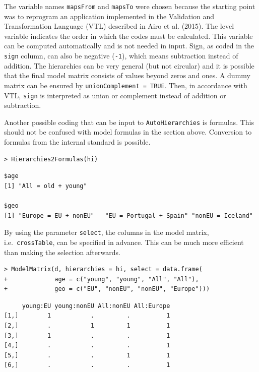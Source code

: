 The variable names \texttt{mapsFrom} and \texttt{mapsTo} were chosen because the starting point was to reprogram an application implemented in the
Validation and Transformation Language (VTL) described in Airo et al. (2015).
The level variable indicates the order in which the codes must be calculated.
This variable can be computed automatically and is not needed in input.
Sign, as coded in the \texttt{sign} column, can also be negative (\texttt{-1}), which means subtraction instead of addition.
The hierarchies can be very general (but not circular) and it is possible that the final model matrix consists of values beyond zeros and ones. A dummy matrix can be ensured by \texttt{unionComplement\ =\ TRUE}.
Then, in accordance with VTL, \texttt{sign} is interpreted as union or complement instead of addition or subtraction.

Another possible coding that can be input to \texttt{AutoHierarchies} is formulas.
This should not be confused with model formulas in the section above.
Conversion to formulas from the internal standard is possible.

\begin{verbatim}
> Hierarchies2Formulas(hi)
\end{verbatim}

\begin{verbatim}
$age
[1] "All = old + young"

$geo
[1] "Europe = EU + nonEU"   "EU = Portugal + Spain" "nonEU = Iceland"      
\end{verbatim}

By using the parameter \texttt{select}, the columns in the model matrix, i.e.~\texttt{crossTable}, can be specified in advance.
This can be much more efficient than making the selection afterwards.

\begin{verbatim}
> ModelMatrix(d, hierarchies = hi, select = data.frame(
+             age = c("young", "young", "All", "All"), 
+             geo = c("EU", "nonEU", "nonEU", "Europe")))
\end{verbatim}

\begin{verbatim}
     young:EU young:nonEU All:nonEU All:Europe
[1,]        1           .         .          1
[2,]        .           1         1          1
[3,]        1           .         .          1
[4,]        .           .         .          1
[5,]        .           .         1          1
[6,]        .           .         .          1
\end{verbatim}


